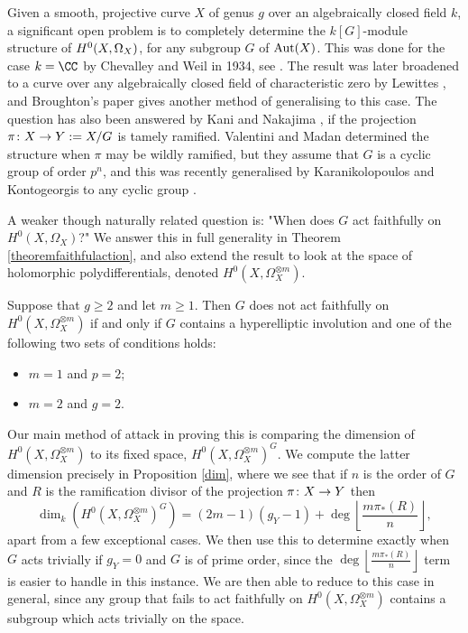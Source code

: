 Given a smooth, projective curve $X$ of genus $g$ over an algebraically closed field $k$, a significant open problem is to completely determine the $k[G]$-module structure of ${H^0(X,\Omega_X)}$, for any subgroup $G$ of $\operatorname{Aut}(X)$.
This was done for the case $k = \CC$ by Chevalley and Weil in 1934, see \cite{chev}.
The result was later broadened to a curve over any algebraically closed field of characteristic zero by Lewittes \cite{lewittes}, and Broughton's paper \cite{broughton} gives another method of generalising to this case.
The question has also been answered by Kani \cite{Kani} and Nakajima \cite{naka2}, if the projection $\pi \colon X \rightarrow Y:= X/G$ is tamely ramified.
Valentini and Madan \cite{valmadan} determined the structure when $\pi$ may be wildly ramified, but they assume that $G$ is a cyclic group of order $p^n$, and this was recently generalised by Karanikolopoulos and Kontogeorgis to any cyclic group \cite{kako}.

A weaker though naturally related question is: "When does $G$ act faithfully on $H^0(X,\Omega_X)$?"
We answer this in full generality in Theorem \ref{theoremfaithfulaction}, and also extend the result to look at the space of holomorphic polydifferentials, denoted $H^0(X,\Omega_X^{\otimes m})$.
    \begin{unnumthm}
    Suppose that $g\geq 2$ and let $m\geq1$. 
    Then $G$ does not act faithfully on $H^0(X,\Omega_X^{\otimes m})$ if and only if $G$ contains a hyperelliptic involution and one of the following two sets of conditions holds:
    \vspace{-1em}
    \begin{itemize}
        \item $m=1$ and $p=2$;
        \item $m=2$ and $g=2$.
        \end{itemize}
    \end{unnumthm}

Our main method of attack in proving this is comparing the dimension of $H^0(X,\Omega_X^{\otimes m})$ to its fixed space, $H^0(X,\Omega_X^{\otimes m})^G$.
We compute the latter dimension precisely in Proposition \ref{dim}, where we see that if $n$ is the order of $G$ and $R$ is the ramification divisor of the projection $\pi \colon X \rightarrow Y$ then 
    \[
    \dim_k \left( H^0(X,\Omega_X^{\otimes m})^G \right) = (2m-1)(g_Y-1) + \deg\left\lfloor\frac{m\pi_*(R)}{n} \right\rfloor,
    \]
apart from a few exceptional cases.
We then use this to determine exactly when $G$ acts trivially if $g_Y = 0$ and $G$ is of prime order, since the $\deg\left\lfloor\frac{m\pi_*(R)}{n} \right\rfloor$ term is easier to handle in this instance.
We are then able to reduce to this case in general, since any group that fails to act faithfully on $H^0(X,\Omega_X^{\otimes m})$ contains a subgroup which acts trivially on the space.


